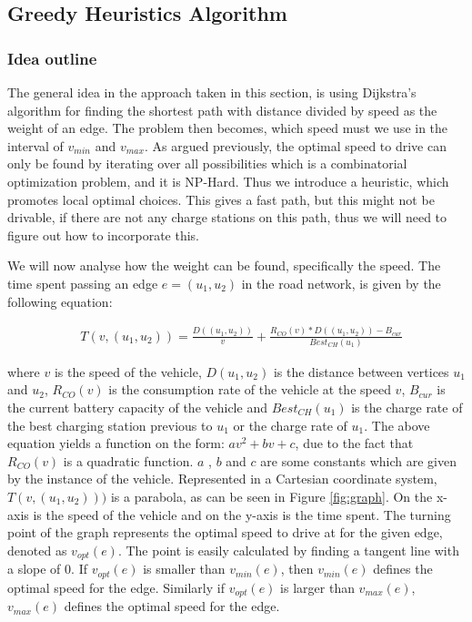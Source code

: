 \subsection{Greedy Heuristics Algorithm}


\subsubsection*{Idea outline}
The general idea in the approach taken in this section, is using Dijkstra's algorithm for finding the shortest path with distance divided by speed as the weight of an edge. The problem then becomes, which speed must we use in the interval of $v_{min}$ and $v_{max}$. As argued previously, the optimal speed to drive can only be found by iterating over all possibilities which is a combinatorial optimization problem, and it is NP-Hard. Thus we introduce a heuristic, which promotes local optimal choices. This gives a fast path, but this might not be drivable, if there are not any charge stations on this path, thus we will need to figure out how to incorporate this.\

We will now analyse how the weight can be found, specifically the speed. The time spent passing an edge $e = (u_1, u_2)$ in the road network, is given by the following equation:

\begin{equation*}
\begin{aligned}
 & T(v,(u_1, u_2)) = \frac{D((u_1, u_2))}{v} + \frac{R_{CO}(v) * D((u_1, u_2)) - B_{cur}}{Best_{CH}(u_1)}
\end{aligned}
\end{equation*}\label{eq:drivingAndCharging}


where $v$ is the speed of the vehicle, $D(u_1, u_2)$ is the distance between vertices $u_1$ and $u_2$, $R_{CO}(v)$ is the consumption rate of the vehicle at the speed $v$, $B_{cur}$ is the current battery capacity of the vehicle and $Best_{CH}(u_1)$ is the charge rate of the best charging station previous to $u_1$ or the charge rate of $u_1$. The above equation yields a function on the form: $av^2 + bv + c$, due to the fact that $R_{CO}(v)$ is a quadratic function. $a$ , $b$ and $c$ are some constants which are given by the instance of the vehicle. 
Represented in a Cartesian coordinate system, $T(v,(u_1, u_2)))$ is a parabola, as can be seen in Figure \ref{fig:graph}. On the x-axis is the speed of the vehicle and on the y-axis is the time spent. The turning point of the graph represents the optimal speed to drive at for the given edge, denoted as $v_{opt}(e)$. The point is easily calculated by finding a tangent line with a slope of $0$. If $v_{opt}(e)$ is smaller than $v_{min}(e)$, then $v_{min}(e)$ defines the optimal speed for the edge. Similarly if $v_{opt}(e)$ is larger than $v_{max}(e)$, $v_{max}(e)$ defines the optimal speed for the edge.

